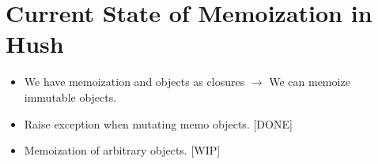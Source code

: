 \documentclass{article}
\begin{document}
\section{Current State of Memoization in Hush}
\begin{itemize}
	\item We have memoization and objects as closures $\to$ We can memoize immutable objects.
	\item Raise exception when mutating memo objects. [DONE]
	\item Memoization of arbitrary objects. [WIP]
\end{itemize}

\printbibliography
\end{document}
